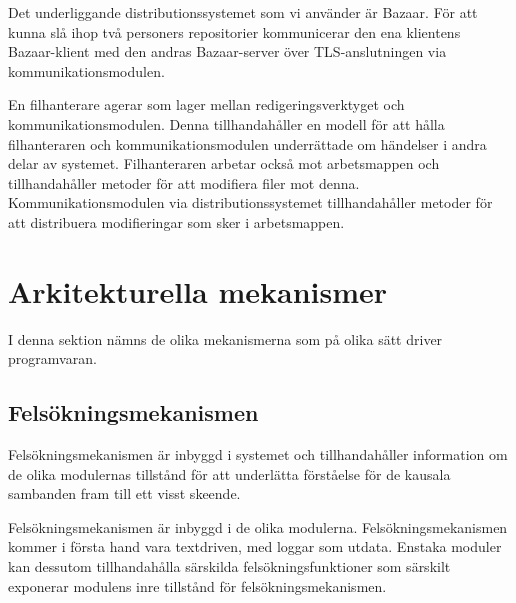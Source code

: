 Det underliggande distributionssystemet som vi använder är Bazaar. För
att kunna slå ihop två personers repositorier kommunicerar den ena
klientens Bazaar-klient med den andras Bazaar-server över
TLS-anslutningen via kommunikationsmodulen.

En filhanterare agerar som lager mellan redigeringsverktyget och
kommunikationsmodulen. Denna tillhandahåller en modell för att hålla
filhanteraren och kommunikationsmodulen underrättade om händelser i
andra delar av systemet. Filhanteraren arbetar också mot arbetsmappen
och tillhandahåller metoder för att modifiera filer mot
denna. Kommunikationsmodulen via distributionssystemet tillhandahåller
metoder för att distribuera modifieringar som sker i arbetsmappen.
\section{Arkitekturella mekanismer}
I denna sektion nämns de olika mekanismerna som på olika sätt driver
programvaran.
\subsection{Felsökningsmekanismen}
Felsökningsmekanismen är inbyggd i systemet och tillhandahåller information om de olika modulernas tillstånd för att underlätta förståelse för de kausala sambanden fram till ett visst skeende.

Felsökningsmekanismen är inbyggd i de olika modulerna. Felsökningsmekanismen kommer i första hand vara textdriven, med loggar som utdata. Enstaka moduler kan dessutom tillhandahålla särskilda felsökningsfunktioner som särskilt exponerar modulens inre tillstånd för felsökningsmekanismen.

